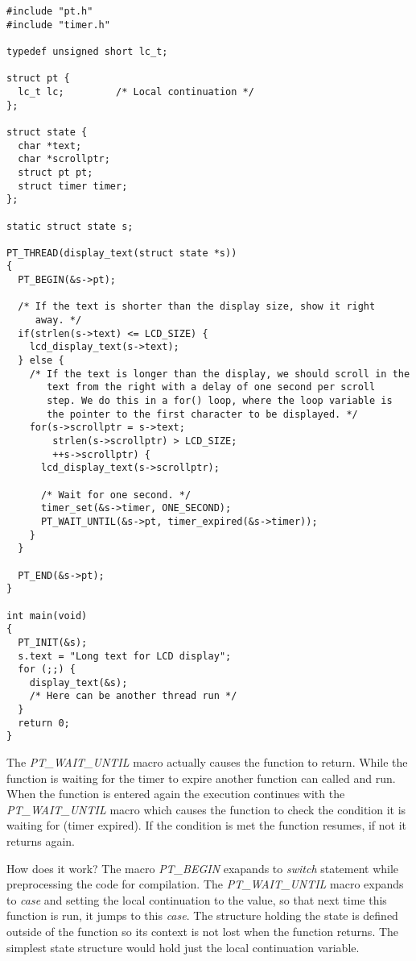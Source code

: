 \begin{lstlisting}
#include "pt.h"
#include "timer.h"

typedef unsigned short lc_t;

struct pt {
  lc_t lc;         /* Local continuation */
}; 

struct state {
  char *text;
  char *scrollptr;
  struct pt pt;
  struct timer timer;
};

static struct state s;
 
PT_THREAD(display_text(struct state *s))
{
  PT_BEGIN(&s->pt);
 
  /* If the text is shorter than the display size, show it right
     away. */
  if(strlen(s->text) <= LCD_SIZE) {
    lcd_display_text(s->text);
  } else {    
    /* If the text is longer than the display, we should scroll in the
       text from the right with a delay of one second per scroll
       step. We do this in a for() loop, where the loop variable is
       the pointer to the first character to be displayed. */
    for(s->scrollptr = s->text;
        strlen(s->scrollptr) > LCD_SIZE;
        ++s->scrollptr) {
      lcd_display_text(s->scrollptr);
 
      /* Wait for one second. */
      timer_set(&s->timer, ONE_SECOND);
      PT_WAIT_UNTIL(&s->pt, timer_expired(&s->timer));
    }
  }
  
  PT_END(&s->pt);
}

int main(void)
{
  PT_INIT(&s);
  s.text = "Long text for LCD display";
  for (;;) {
    display_text(&s);
    /* Here can be another thread run */
  }
  return 0;
}

\end{lstlisting}

The {\it PT\_WAIT\_UNTIL} macro actually causes the function
to return. While the function is waiting for the timer to expire another function can called and run.
When the function is entered again the execution continues with the {\it PT\_WAIT\_UNTIL} macro
which causes the function to check the condition it is waiting for (timer expired). If the condition is
met the function resumes, if not it returns again.

How does it work? The macro {\it PT\_BEGIN} exapands to {\it switch} statement while preprocessing the
code for compilation. The {\it PT\_WAIT\_UNTIL} macro expands to {\it case} and setting the local continuation
to the value, so that next time this function is run, it jumps to this {\it case}.
The structure holding the state is defined outside of the function so its context is not lost when
the function returns. The simplest state structure would hold just the local continuation variable.

